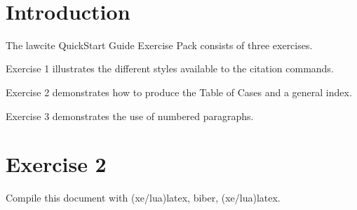 \newcommand\markthis[1]{\textcolor{red}{\textbf{#1}}}



\makeindex
{}
\newcommand\pagerefindexnoteb{{\small\mdseries\itshape\hfill Page}}
\setindexpreamble[cases]{\pagerefindexnoteb}
\setindexpreamble[legislation]{\pagerefindexnoteb}
\setindexpreamble[regulations]{\pagerefindexnoteb}

\usepackage[
				bookmarks,
            colorlinks=true,        
            allcolors = black,  
            citecolor=blue,        
            pageanchor=true,
            plainpages=false,
            hyperindex=false, 
]{hyperref}


\newcommand\illus[2]{\bigskip\noindent\fbox{#1}\\#2}



\maketitle
\tableofcontents


\setindexhyperlinks
\let\xoldtwocolumn\twocolumn
\iftoggle{printlegtoc}{%
\let\oldtwocolumn\twocolumn
\renewcommand{\twocolumn}[1][]{#1}
\let\oldclearpage\clearpage
\renewcommand\clearpage{\relax}
\extendtheindex{}{\useindexpreamble}{}{}
\printindex[cases]
\printindex[legislation]
\iftoggle{printregulations}{\printindex[regulations]}{}
\renewcommand{\twocolumn}[1][]{\oldtwocolumn}
\renewcommand\clearpage{\oldclearpage}
}{}
\bigskip
\hfill{}\hfill\ %
\bigskip

\section{Introduction}
The lawcite QuickStart Guide Exercise Pack consists of three exercises.

Exercise 1 illustrates the different styles available to the citation commands.

Exercise 2 demonstrates how to produce the Table of Cases and a general index.

Exercise 3 demonstrates the use of numbered paragraphs.

\section{Exercise 2}
Compile this document with (xe/lua)latex, biber, (xe/lua)latex.

